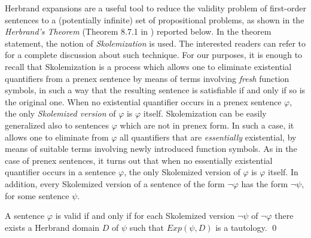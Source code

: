 \documentclass[a4paper]{llncs}
\newcommand{\HExp}{Exp}
\begin{document}
Herbrand expansions are a useful tool to reduce the validity
problem of first-order sentences to a (potentially infinite) set of
propositional problems, as shown in the \emph{Herbrand's Theorem}
(Theorem 8.7.1 in \cite{Fitting96}) reported below.
In the theorem statement, the notion of \emph{Skolemization} is
used. The interested readers can refer to \cite{NonWei2001}
for a complete discussion about such technique.
For our purposes, it is enough to recall that Skolemization is
a process which allows one to eliminate existential quantifiers from 
a prenex sentence by means of terms involving \emph{fresh} function 
symbols, in such a way that the resulting sentence is satisfiable if 
and only if so is the
original one. When no existential quantifier occurs in a prenex 
sentence $\varphi$, the only \emph{Skolemized version} of $\varphi$ is
$\varphi$ itself. Skolemization can be easily generalized also to 
sentences $\varphi$ which are not in prenex form. In such a case, it 
allows one to eliminate from $\varphi$ all quantifiers that are 
\emph{essentially} existential, by means of suitable terms involving 
newly introduced function symbols. As in the case of prenex 
sentences, it turns out that
when no essentially existential quantifier occurs in a sentence 
$\varphi$, the only Skolemized version of $\varphi$ is $\varphi$ 
itself. In addition, every Skolemized version of a sentence of the 
form $\neg \varphi$ has the form $\neg \psi$, for some sentence 
$\psi$.


\begin{theorem}\label{HERVAL}
A sentence $\varphi$ is valid if and only if for each Skolemized 
version $\neg \psi$ of $\neg \varphi$ there exists a Herbrand domain 
$D$ of $\psi$ such that $\HExp(\psi, D)$ is a tautology. \qed
%
\end{theorem}
\end{document}
